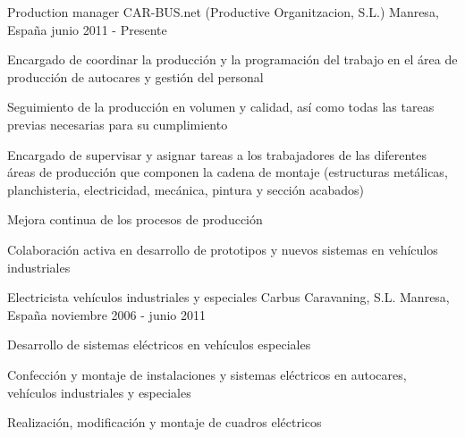 

\begin{cventries}

  \cventry
    {Production manager} %
    {CAR-BUS.net (Productive Organitzacion, S.L.)} %
    {Manresa, España} %
    {junio 2011 - Presente} %
    {
      \begin{cvitems} %
        \item {Encargado de coordinar la producción y la programación del trabajo en el área de producción de autocares y gestión del personal}
        \item {Seguimiento de la producción en volumen y calidad, así como todas las tareas previas necesarias para su cumplimiento}
        \item {Encargado de supervisar y asignar tareas a los trabajadores de las diferentes áreas de producción que componen la cadena de montaje (estructuras metálicas, planchisteria, electricidad, mecánica, pintura y sección acabados)}
        \item {Mejora continua de los procesos de producción}
        \item {Colaboración activa en desarrollo de prototipos y nuevos sistemas en vehículos industriales}
      \end{cvitems}
    }

  \cventry
    {Electricista vehículos industriales y especiales} %
    {Carbus Caravaning, S.L.} %
    {Manresa, España} %
    {noviembre 2006 - junio 2011} %
    {
      \begin{cvitems} %
        \item {Desarrollo de sistemas eléctricos en vehículos especiales}
        \item {Confección y montaje de instalaciones y sistemas eléctricos en autocares, vehículos industriales y especiales}
        \item {Realización, modificación y montaje de cuadros eléctricos}
      \end{cvitems}
    }


\end{cventries}
